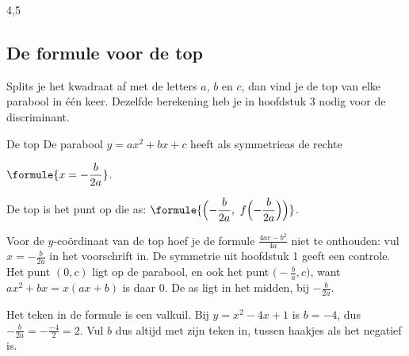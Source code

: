 \begin{alleenvoor}{4,5}
\subsection{De formule voor de top}

Splits je het kwadraat af met de letters $a$, $b$ en $c$, dan vind je de top van elke parabool in één keer. Dezelfde berekening heb je in hoofdstuk 3 nodig voor de discriminant.
\begin{theorie}
\begin{stelling}{De top}
De parabool $y = ax^2 + bx + c$ heeft als symmetrieas de rechte

\qquad $\formule{x = -\dfrac{b}{2a}}$.


De top is het punt op die as: $\formule{\Bigl(-\dfrac{b}{2a},\ f\Bigl(-\dfrac{b}{2a}\Bigr)\Bigr)}$.
\end{stelling}
\end{theorie}

Voor de $y$-coördinaat van de top hoef je de formule $\tfrac{4ac - b^2}{4a}$ niet te onthouden: vul $x = -\tfrac{b}{2a}$ in het voorschrift in. De symmetrie uit hoofdstuk 1 geeft een controle. Het punt $(0, c)$ ligt op de parabool, en ook het punt $\bigl(-\tfrac ba, c\bigr)$, want $ax^2 + bx = x(ax + b)$ is daar $0$. De as ligt in het midden, bij $-\tfrac{b}{2a}$.
\end{alleenvoor}

Het teken in de formule is een valkuil. Bij $y = x^2 - 4x + 1$ is $b = -4$, dus $-\tfrac{b}{2a} = -\tfrac{-4}{2} = 2$. Vul $b$ dus altijd met zijn teken in, tussen haakjes als het negatief is.

